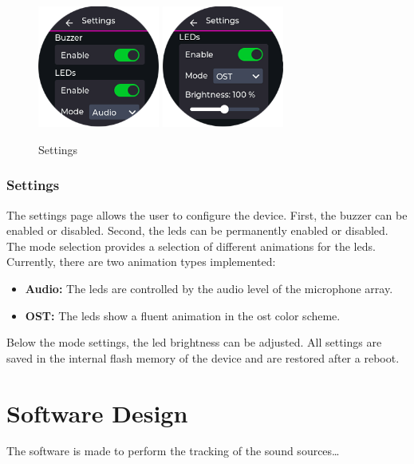 \begin{minipage}{\linewidth}
	\begin{figure}
		\vspace{-0.6cm}
		\includegraphics[width=4cm, trim={0 -1.0cm 0 0}]{images/6_design_final/gui/13_settings.png}
		\includegraphics[width=4cm]{images/6_design_final/gui/14_settings.png}
		\centering
		\caption{Settings}
		\label{fig:final_design_gui_settings}
	\end{figure}
	\subsubsection{Settings}
	The settings page allows the user to configure the device.
	First, the buzzer can be enabled or disabled.
	Second, the \acrshort{led}s can be permanently enabled or disabled.
	The mode selection provides a selection of different animations for the \acrshort{led}s.
	Currently, there are two animation types implemented:
	\begin{itemize}
		\setlength{\itemindent}{5mm}
		\setlength{\leftmargin}{10mm}
		\item \textbf{Audio:} The \acrshort{led}s are controlled by the audio level of the microphone array.
		\item \textbf{OST:} The \acrshort{led}s show a fluent animation in the \acrshort{ost} color scheme.
	\end{itemize}
	Below the mode settings, the \acrshort{led} brightness can be adjusted.
	All settings are saved in the internal flash memory of the device and are restored after a reboot.
\end{minipage}


\newpage
\section{Software Design}
The software is made to perform the tracking of the sound sources\dots


